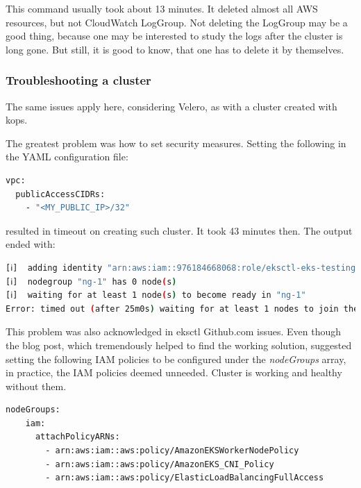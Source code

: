 This command usually took about 13 minutes. It deleted almost all AWS resources, but not CloudWatch LogGroup. Not deleting the LogGroup may be a good thing, because one may be interested to study the logs after the cluster is long gone. But still, it is good to know, that one has to delete it by themselves.

\subsubsection{Troubleshooting a cluster}
\label{eks-troubleshooting}

The same issues apply here, considering Velero, as with a cluster created with kops.


The greatest problem was how to set security measures. Setting the following in the YAML configuration file:
\begin{lstlisting}[basicstyle=\tiny,caption={Attempt to setup security},captionpos=b,language=Bash,xleftmargin=1cm]
vpc:
  publicAccessCIDRs:
    - "<MY_PUBLIC_IP>/32"
\end{lstlisting}
resulted in timeout on creating such cluster. It took 43 minutes then. The output ended with:

\begin{lstlisting}[basicstyle=\tiny,caption={Error output from creating eksctl cluster},captionpos=b,language=Bash,xleftmargin=1cm]
[ℹ]  adding identity "arn:aws:iam::976184668068:role/eksctl-eks-testing-nodegroup-ng-1-NodeInstanceRole-8VB5IDO1Z4KQ" to auth ConfigMap
[ℹ]  nodegroup "ng-1" has 0 node(s)
[ℹ]  waiting for at least 1 node(s) to become ready in "ng-1"
Error: timed out (after 25m0s) waiting for at least 1 nodes to join the cluster and become ready in "ng-1"
\end{lstlisting}
This problem was also acknowledged in eksctl Github.com issues\cite{eksctl-net-issue1}\cite{eksctl-net-issue2}. Even though the blog post\cite{eksctl-net-issue-solution}, which tremendously helped to find the working solution, suggested setting the following IAM policies to be configured under the \textit{nodeGroups} array, in practice, the IAM policies deemed unneeded. Cluster is working and healthy without them.
\begin{lstlisting}[basicstyle=\tiny,caption={IAM policies recommended for eksctl by a blog post},captionpos=b,language=Bash,xleftmargin=1cm]
nodeGroups:
    iam:
      attachPolicyARNs:
        - arn:aws:iam::aws:policy/AmazonEKSWorkerNodePolicy
        - arn:aws:iam::aws:policy/AmazonEKS_CNI_Policy
        - arn:aws:iam::aws:policy/ElasticLoadBalancingFullAccess
\end{lstlisting}

